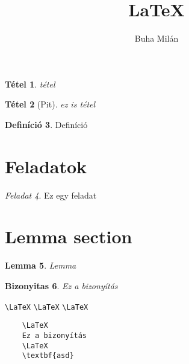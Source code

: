 \documentclass{article}
\title{\Huge{\LaTeX}}
\author{Buha Milán}
\theoremstyle{plain}
\newtheorem{tet}{Tétel}
\theoremstyle{definition}
\newtheorem{defin}[tet]{Definíció}
\theoremstyle{plain}
\newtheorem{lemma}[tet]{Lemma}
\theoremstyle{remark}
\newtheorem{feladat}[tet]{Feladat}
\theoremstyle{plain}
\newtheorem{bizonyitas}[tet]{Bizonyitas}
\begin{document}
	\maketitle
	\newpage
	
	\begin{tet}
	tétel
	\end{tet}
	
	\begin{tet}[Pit]
	ez is tétel
	\end{tet}
	
	\begin{defin}
	Definíció
	\end{defin}
	
	\section{Feladatok} \begin{feladat} Ez egy feladat \end{feladat}
	\section{Lemma section} \begin{lemma} Lemma \end{lemma}
	
	\begin{bizonyitas}
	Ez a bizonyítás
	\end{bizonyitas}
	
	\newpage
	\verb|\LaTeX| \verb|\LaTeX| \verb|\LaTeX|
	
	\begin{verbatim}
	\LaTeX
	Ez a bizonyítás
	\LaTeX
	\textbf{asd}
	\end{verbatim}
\end{document}
